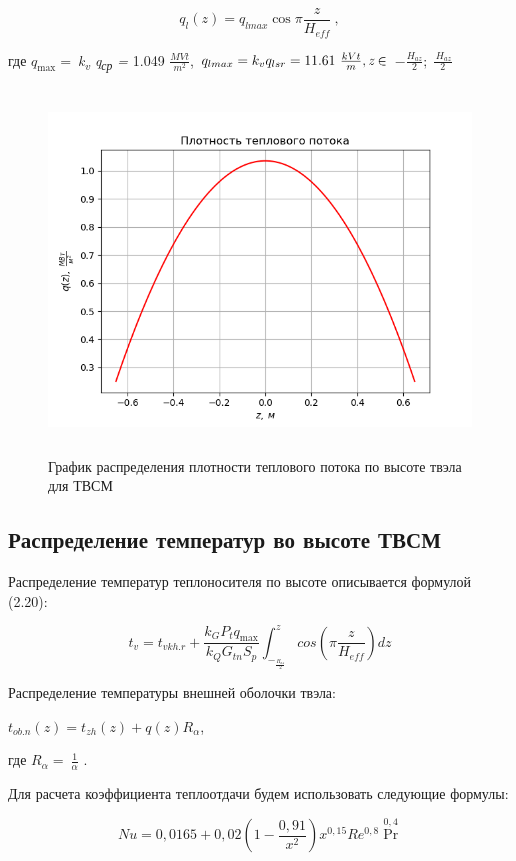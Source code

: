 \[q_{l}\left( z \right) = q_{lmax}\cos \pi\frac{z}{H_{eff}} \ ,\]

где \(q_{\max} = \ \)\emph{k\textsubscript{v} q\textsubscript{ср} =}
1.049 \(\frac{MVt}{m^{2}}\),
\(q_{lmax} = k_{v}q_{lsr} = 11.61\ \frac{kVt}{m} , \emph{z} \in\)
\( - \frac{H_{az}}{2};\ \frac{{\ H}_{az}}{2} \)

\begin{figure}[!h]
\center
\includegraphics[width=5.11811in,height=3.80659in]{media/image9.png}
\caption{График распределения плотности теплового потока по высоте
твэла для ТВСМ}
\end{figure}

\subsection{Распределение температур во высоте ТВСМ}

Распределение температур теплоносителя по высоте описывается формулой
(2.20):

\[t_{v} = t_{vkh.r} + \frac{k_{G}P_{t}q_{\max}}{k_{Q}G_{tn}S_{p}}\int_{-_{\frac{H_{az}}{2}}}^{z}{cos\left( \pi\frac{z}{H_{eff}} \right)dz}\]

Распределение температуры внешней оболочки твэла:

\(t_{ob.n}\left( z \right) = t_{zh}\left( z \right) + q\left( z \right)R_{\alpha}\),

где \(R_{\alpha} = \ \frac{1}{\alpha}\) .

Для расчета коэффициента теплоотдачи будем использовать следующие
формулы:

\[Nu =  0,0165 + 0,02\left( 1 - \frac{0,91}{x^{2}} \right)x^{0,15} Re^{0,8}\Pr^{0,4}\]

